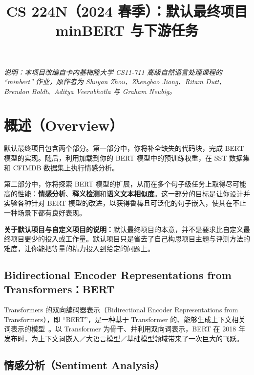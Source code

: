 \documentclass[11pt]{article}
\title{\textbf{CS 224N（2024 春季）：默认最终项目 \\ minBERT 与下游任务}}
\author{}
\date{}
\begin{document}
\maketitle
\vspace{-2em}

\begin{center}
\small\textit{说明：本项目改编自卡内基梅隆大学 CS11-711 高级自然语言处理课程的 ``minbert'' 作业，原作者为 Shuyan Zhou、Zhengbao Jiang、Ritam Dutt、Brendon Boldt、Aditya Veerubhotla 与 Graham Neubig。}
\end{center}

\tableofcontents
\newpage

\section{概述（Overview）}

默认最终项目包含两个部分。第一部分中，你将补全缺失的代码块，完成 BERT 模型的实现。随后，利用加载到你的 BERT 模型中的预训练权重，在 SST 数据集和 CFIMDB 数据集上执行情感分析。

第二部分中，你将探索 BERT 模型的扩展，从而在多个句子级任务上取得尽可能高的性能：\textbf{情感分析}、\textbf{释义检测}和\textbf{语义文本相似度}。这一部分的目标是让你设计并实验各种针对 BERT 模型的改进，以获得鲁棒且可泛化的句子嵌入，使其在不止一种场景下都有良好表现。

\textbf{关于默认项目与自定义项目的说明：}默认最终项目的本意，并不是要求比自定义最终项目更少的投入或工作量。默认项目只是省去了自己构思项目主题与评测方法的难度，让你能把等量的精力投入到给定的问题上。

\subsection{Bidirectional Encoder Representations from Transformers：BERT}

Transformers 的双向编码器表示（Bidirectional Encoder Representations from Transformers），即 ``BERT''，是一种基于 Transformer 的、能够生成上下文相关词表示的模型~\cite{devlin2018bert}。以 Transformer 为骨干、并利用双向词表示，BERT 在 2018 年发布时，为上下文词嵌入／大语言模型／基础模型领域带来了一次巨大的飞跃。

\subsection{情感分析（Sentiment Analysis）}
\end{document}
